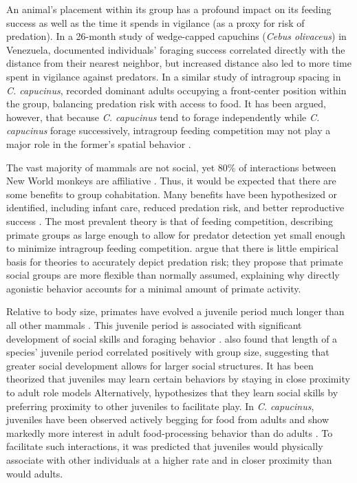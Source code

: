 \documentclass{../../../coursework}
\begin{document}
An animal's placement within its group has a profound impact on its feeding
success as well as the time it spends in vigilance (as a proxy for risk of
predation). In a 26-month study of wedge-capped capuchins
(\emph{Cebus olivaceus}) in Venezuela, \textcite{Robinson1981} documented
individuals' foraging success correlated directly with the distance from their
nearest neighbor, but increased distance also led to more time spent in
vigilance against predators. In a similar study of intragroup spacing in
\emph{C. capucinus}, \textcite{Hall1997} recorded dominant adults occupying a
front-center position within the group, balancing predation risk with access
to food. It has been argued, however, that because \emph{C. capucinus} tend to
forage independently while \emph{C. capucinus} forage successively, intragroup
feeding competition may not play a major role in the former's spatial behavior
\parencite{Fragaszy2004}.

The vast majority of mammals are not social, yet 80\% of interactions between
New World monkeys are affiliative \parencite{Sussman2005}. Thus, it would be
expected that there are some benefits to group cohabitation. Many benefits
have been hypothesized or identified, including infant care, reduced predation
risk, and better reproductive success \parencite{Fragaszy2004}. The most
prevalent theory is that of feeding competition, describing primate groups as
large enough to allow for predator detection yet small enough to minimize
intragroup feeding competition. \textcite{Sussman2011} argue that there is
little empirical basis for theories to accurately depict predation risk; they
propose that primate social groups are more flexible than normally assumed,
explaining why directly agonistic behavior accounts for a minimal amount of
primate activity.

Relative to body size, primates have evolved a juvenile period much longer
than all other mammals \parencite{Harvey1985}. This juvenile period is
associated with significant development of social skills \parencite{Joffe1997}
and foraging behavior \parencite{Rapaport2008}. \textcite{Joffe1997} also
found that length of a species' juvenile period correlated positively with
group size, suggesting that greater social development allows for larger
social structures. It has been theorized that juveniles may learn certain
behaviors by staying in close proximity to adult role models
\parencite{Sherrow2011} Alternatively, \textcite{Strier2007} hypothesizes that
they learn social skills by preferring proximity to other juveniles to
facilitate play. In \emph{C. capucinus}, juveniles have been observed actively
begging for food from adults \parencite{Perry1994} and show markedly more
interest in adult food-processing behavior than do adults
\parencite{OMalley2005}. To facilitate such interactions, it was predicted
that juveniles would physically associate with other individuals at a higher
rate and in closer proximity than would adults.
\end{document}
